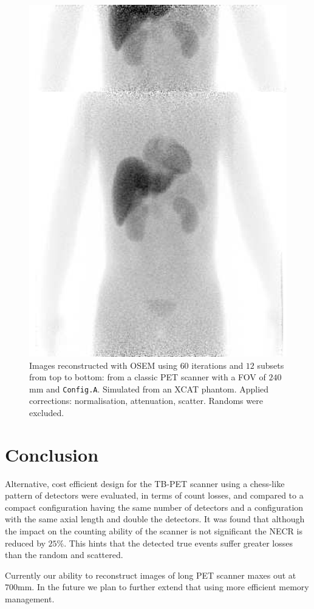 \documentclass[journal]{IEEEtran}
\begin{document}
\begin{figure}
    \centering
    \includegraphics[width=0.85\linewidth]{recs.png}
    \caption{Images reconstructed with OSEM using $60$ iterations and $12$ subsets from top to bottom: from a classic PET scanner with a FOV of $240$mm and \texttt{Config.A}. Simulated from an XCAT phantom. Applied corrections: normalisation, attenuation, scatter. Randoms were excluded.}
    \label{fig:recs}
\end{figure}

\section{Conclusion}
Alternative, cost efficient design for the TB-PET scanner using a chess-like pattern of detectors were evaluated, in terms of count losses, and compared to a compact configuration having the same number of detectors and a configuration with the same axial length and double the detectors. It was found that although the impact on the counting ability of the scanner is not significant the NECR is reduced by $25\%$. This hints that the detected true events suffer greater losses than the random and scattered. 

Currently our ability to reconstruct images of long PET scanner maxes out at $700$mm. In the future we plan to further extend that using more efficient memory management. 

\AtNextBibliography{\small}
\printbibliography
\end{document}
